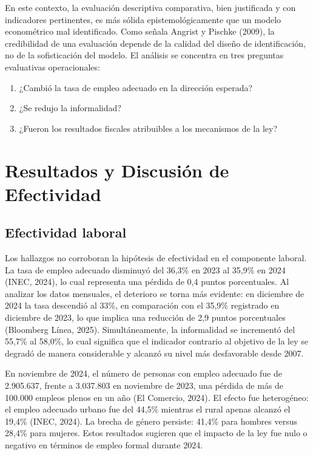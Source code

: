 \documentclass[12pt,spanish]{article}
\providecommand{\tightlist}{%
  \setlength{\itemsep}{0pt}\setlength{\parskip}{0pt}}
\begin{document}
En este contexto, la evaluación descriptiva comparativa, bien
justificada y con indicadores pertinentes, es más sólida
epistemológicamente que un modelo econométrico mal identificado. Como
señala Angrist y Pischke (2009), la credibilidad de una evaluación
depende de la calidad del diseño de identificación, no de la
sofisticación del modelo. El análisis se concentra en tres preguntas
evaluativas operacionales:

\begin{enumerate}
\def\labelenumi{\arabic{enumi})}
\tightlist
\item
  ¿Cambió la tasa de empleo adecuado en la dirección esperada?
\item
  ¿Se redujo la informalidad?
\item
  ¿Fueron los resultados fiscales atribuibles a los mecanismos de la
  ley?
\end{enumerate}

\section{Resultados y Discusión de
Efectividad}\label{resultados-y-discusiuxf3n-de-efectividad}

\subsection{Efectividad laboral}\label{efectividad-laboral}

Los hallazgos no corroboran la hipótesis de efectividad en el componente
laboral. La tasa de empleo adecuado disminuyó del 36,3\% en 2023 al
35,9\% en 2024 (INEC, 2024), lo cual representa una pérdida de 0,4
puntos porcentuales. Al analizar los datos mensuales, el deterioro se
torna más evidente: en diciembre de 2024 la tasa descendió al 33\%, en
comparación con el 35,9\% registrado en diciembre de 2023, lo que
implica una reducción de 2,9 puntos porcentuales (Bloomberg Línea,
2025). Simultáneamente, la informalidad se incrementó del 55,7\% al
58,0\%, lo cual significa que el indicador contrario al objetivo de la
ley se degradó de manera considerable y alcanzó su nivel más
desfavorable desde 2007.

En noviembre de 2024, el número de personas con empleo adecuado fue de
2.905.637, frente a 3.037.803 en noviembre de 2023, una pérdida de más
de 100.000 empleos plenos en un año (El Comercio, 2024). El efecto fue
heterogéneo: el empleo adecuado urbano fue del 44,5\% mientras el rural
apenas alcanzó el 19,4\% (INEC, 2024). La brecha de género persiste:
41,4\% para hombres versus 28,4\% para mujeres. Estos resultados
sugieren que el impacto de la ley fue nulo o negativo en términos de
empleo formal durante 2024.
\end{document}
